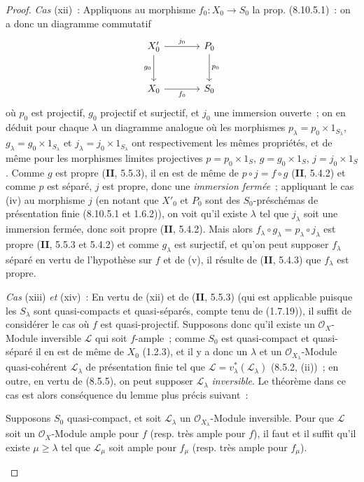 \begin{proof}
\emph{Cas} (xii)~: Appliquons au morphisme $f_0:X_0\to S_0$ la prop.
(8.10.5.1)~: on a donc un diagramme commutatif
\[
\begin{tikzcd}[column sep=large,row sep=large]
X'_0 \arrow[r,"j_0"] \arrow[d,"g_0"'] & P_0 \arrow[d,"p_0"] \\
X_0 \arrow[r,"f_0"'] & S_0
\end{tikzcd}
\]
où $p_0$ est projectif, $g_0$ projectif et surjectif, et $j_0$ une immersion
ouverte~; on en déduit pour chaque $\lambda$ un diagramme analogue où les
morphismes $p_\lambda=p_0\times1_{S_\lambda}$,
$g_\lambda=g_0\times1_{S_\lambda}$ et $j_\lambda=j_0\times1_{S_\lambda}$ ont
respectivement les mêmes propriétés, et de même pour les morphismes limites
projectives $p=p_0\times1_S$, $g=g_0\times1_S$, $j=j_0\times1_S$. Comme $g$
est propre (\textbf{II}, 5.5.3), il en est de même de $p\circ j=f\circ g$ (\textbf{II}, 5.4.2)
et comme $p$ est séparé, $j$ est propre, donc une \emph{immersion fermée}~;
appliquant le cas (iv) au morphisme $j$ (en notant que $X'_0$ et $P_0$ sont
des $S_0$-préschémas de présentation finie (8.10.5.1 et 1.6.2)), on voit
qu'il existe $\lambda$ tel que $j_\lambda$ soit une immersion fermée, donc
soit propre (\textbf{II}, 5.4.2). Mais alors
$f_\lambda\circ g_\lambda=p_\lambda\circ j_\lambda$ est propre (\textbf{II}, 5.5.3 et
5.4.2) et comme $g_\lambda$ est surjectif, et qu'on peut supposer $f_\lambda$
séparé en vertu de l'hypothèse sur $f$ et de (v), il résulte de (\textbf{II}, 5.4.3)
que $f_\lambda$ est propre.

\emph{Cas} (xiii) \emph{et} (xiv)~: En vertu de (xii) et de (\textbf{II}, 5.5.3) (qui est
applicable puisque les $S_\lambda$ sont quasi-compacts et quasi-séparés,
compte tenu de (1.7.19)), il suffit de
considérer le cas où $f$ est quasi-projectif. Supposons donc qu'il existe un
$\mathcal O_X$-Module inversible $\mathcal L$ qui soit $f$-ample~; comme $S_0$
est quasi-compact et quasi-séparé il en est de même de $X_0$ (1.2.3), et il y
a donc un $\lambda$ et un $\mathcal O_{X_\lambda}$-Module quasi-cohérent
$\mathcal L_\lambda$ de présentation finie tel que
$\mathcal L=v_\lambda^*(\mathcal L_\lambda)$ (8.5.2, (ii))~; en outre, en
vertu de (8.5.5), on peut supposer $\mathcal L_\lambda$ \emph{inversible}. Le théorème
dans ce cas est alors conséquence du lemme plus précis suivant~:

\begin{lemma}[8.10.5.2]
\label{IV.8.10.5.2-fr}
Supposons $S_0$ quasi-compact, et soit $\mathcal L_\lambda$ un
$\mathcal O_{X_\lambda}$-Module inversible. Pour que $\mathcal L$ soit un
$\mathcal O_X$-Module ample pour $f$ \textup{(resp.} très ample pour $f$\textup{)}, il faut et
il suffit qu'il existe $\mu\geq\lambda$ tel que $\mathcal L_\mu$ soit ample
pour $f_\mu$ \textup{(resp.} très ample pour $f_\mu$\textup{)}.
\end{lemma}


\end{proof}
